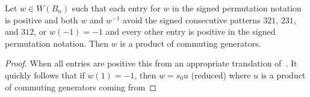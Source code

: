 \begin{proposition}\label{lem:prodofcommA}
Let $w \in W(B_n)$ such that each entry for $w$ in the signed permutation notation is positive and both $w$ and $w^{-1}$ avoid the signed consecutive patterns $321$, $231$, and $312$, or $w(-1)=-1$ and every other entry is positive in the signed permutation notation. Then $w$ is a product of commuting generators.
\begin{proof}
	When all entries are positive this from an appropriate translation of~\cite[Lemma 2.2.9]{Gern2013a}. It quickly follows that if $w(1)=-1$, then $w=s_0u$ (reduced) where $u$ is a product of commuting generators coming from %
\end{proof}	
\end{proposition}

%	
%	

